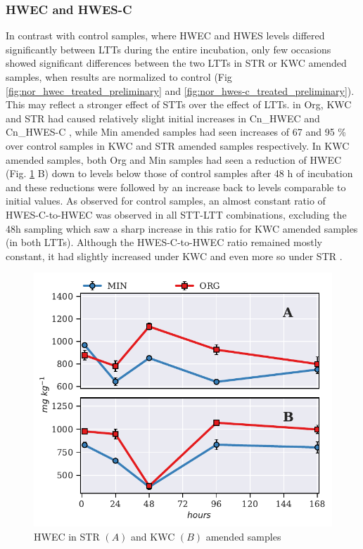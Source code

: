 \documentclass[12pt]{report}
\newcommand{\ScalePreTreated}{1.2}
\begin{document}
		
		
	\subsubsection{HWEC and HWES-C}
		In contrast with control samples, where HWEC and HWES levels differed significantly between LTTs during the entire incubation, only few occasions showed significant differences between the two LTTs in STR or KWC amended samples, when results are normalized to control (Fig \ref{fig:nor_hwec_treated_preliminary} and \ref{fig:nor_hwes-c_treated_preliminary}). This may reflect a stronger effect of STTs over the effect of LTTs.
		in Org, KWC and STR had caused relatively slight initial increases in Cn\_HWEC and Cn\_HWES-C  , while Min amended samples had seen increases of 67 and 95 \% over control samples in KWC and STR amended samples respectively. In KWC amended samples, both Org and Min samples  had seen a reduction of HWEC (Fig. \ref{fig:hwec_treated_preliminary} B) down to levels below those of control samples after 48 h of incubation and these reductions were followed by an increase back to levels comparable to initial values.
		As observed for control samples, an almost constant ratio of HWES-C-to-HWEC was observed in all STT-LTT combinations, excluding the 48h sampling which saw a sharp increase in this ratio for KWC amended samples (in both LTTs). Although the HWES-C-to-HWEC ratio remained mostly constant, it had slightly increased under KWC and even more so under STR .	
		
		\begin{figure}[H]
			\centering
			\includegraphics[scale=\ScalePreTreated]{thesis_figures/preliminary/treated/HWEC.pdf}
			\caption{HWEC in STR $\left(A\right)$ and KWC $\left(B\right)$ amended   samples}
			\label{fig:hwec_treated_preliminary}
		\end{figure}
		
\end{document}
